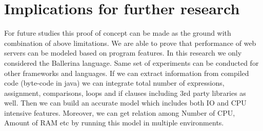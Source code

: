 \section{Implications for further research}

For future studies this proof of concept can be made as the ground with combination of above limitations. We are able to prove that performance of web servers can be modeled based on program features. In this research we only considered the Ballerina language. Same set of experiments can be conducted for other frameworks and languages. If we can extract information from compiled code (byte-code in java) we can integrate total number of expressions, assignment, comparisons, loops and if clauses including 3rd party libraries as well. Then we can build an accurate model which includes both IO and CPU intensive features. Moreover, we can get relation among Number of CPU, Amount of RAM etc by running this model in multiple environments.     
